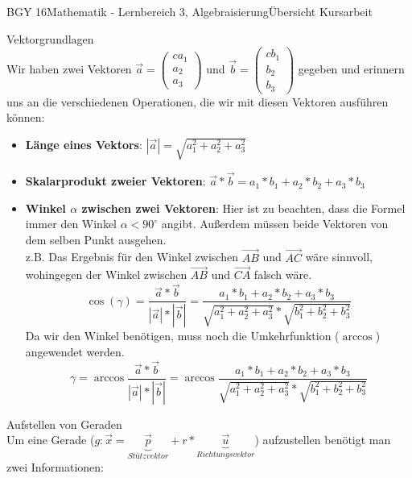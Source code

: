 \documentclass[oneside,openany,headings=optiontotoc,11pt,numbers=noenddot]{scrreprt}
\begin{document}
	\begin{worksheet}{BGY 16}{Mathematik - Lernbereich 3, Algebraisierung}{Übersicht Kursarbeit}
		
		\begin{framed}
			\noindent
			\tiny{\color{codegray} Vektorgrundlagen}\\
			\normalcolor\normalsize
			Wir haben zwei Vektoren \(\vec{a} = \left(\begin{matrix}{c}a_1\\a_2\\a_3\end{matrix}\right)\) und \(\vec{b} = \left(\begin{matrix}{c}b_1\\b_2\\b_3\end{matrix}\right)\) gegeben und erinnern uns an die verschiedenen Operationen, die wir mit diesen Vektoren ausführen können:
			\begin{itemize}
				\item[] \textbf{Länge eines Vektors}: \(|\vec{a}| = \sqrt{a_1^2 + a_2^2 + a_3^2}\)
				\item[] \textbf{Skalarprodukt zweier Vektoren}: \(\vec{a}*\vec{b} = a_1*b_1 + a_2*b_2 + a_3*b_3\)
				\item[] \textbf{Winkel \(\alpha\) zwischen zwei Vektoren}: Hier ist zu beachten, dass die Formel immer den Winkel \(\alpha < 90^\circ\) angibt. Außerdem müssen beide Vektoren von dem selben Punkt ausgehen.\\
				z.B. Das Ergebnis für den Winkel zwischen \(\vec{AB}\) und \(\vec{AC}\) wäre sinnvoll, wohingegen der Winkel zwischen \(\vec{AB}\) und \(\vec{CA}\) falsch wäre.\\
				\[\cos(\gamma) = \frac{\vec{a}*\vec{b}}{|\vec{a}|*|\vec{b}|} = \frac{a_1*b_1 + a_2*b_2 + a_3*b_3}{\sqrt{a_1^2 + a_2^2 + a_3^2}*\sqrt{b_1^2 + b_2^2 + b_3^2}}\]
				Da wir den Winkel benötigen, muss noch die Umkehrfunktion (\(\arccos\)) angewendet werden.
				\[\gamma = \arccos{\frac{\vec{a}*\vec{b}}{|\vec{a}|*|\vec{b}|}} = \arccos{\frac{a_1*b_1 + a_2*b_2 + a_3*b_3}{\sqrt{a_1^2 + a_2^2 + a_3^2}*\sqrt{b_1^2 + b_2^2 + b_3^2}}}\]
			\end{itemize}
		\end{framed}
		\begin{framed}
			\noindent
			\tiny{\color{codegray}Aufstellen von Geraden}\\
			\normalcolor\normalsize
			Um eine Gerade (\(g: \vec{x} = \underbrace{\vec{p}}_{Stützvektor} + r*\underbrace{\vec{u}}_{Richtungsvektor}\)) aufzustellen benötigt man zwei Informationen:

\end{framed}
\end{worksheet}
\end{document}
